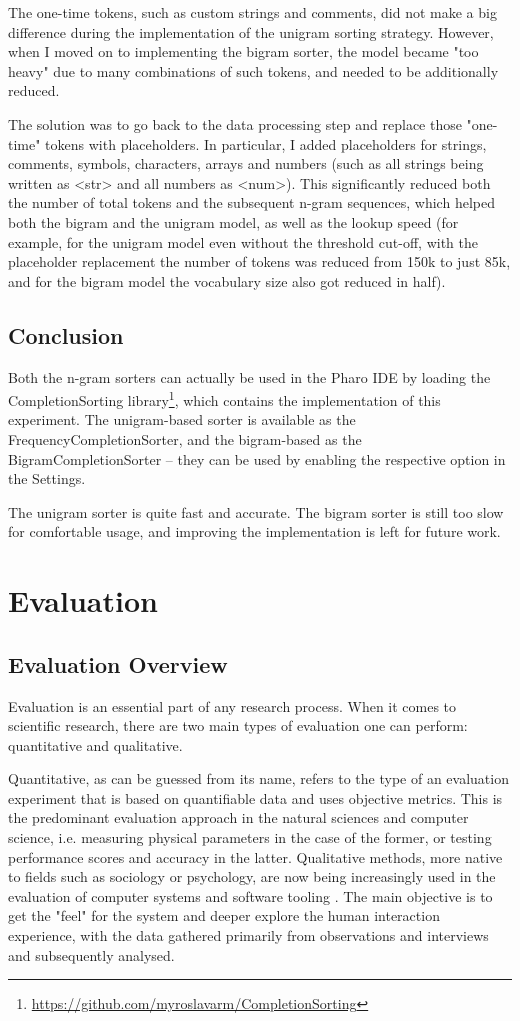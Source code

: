 \documentclass[sigplan,screen]{acmart}
\begin{document}
The one-time tokens, such as custom strings and comments, did not make a big difference during the implementation of the unigram sorting strategy. However, when I moved on to implementing the bigram sorter, the model became "too heavy" due to many combinations of such tokens, and needed to be additionally reduced.

The solution was to go back to the data processing step and replace those "one-time" tokens with placeholders. In particular, I added placeholders for strings, comments, symbols, characters, arrays and numbers (such as all strings being written as <str> and all numbers as <num>). This significantly reduced both the number of total tokens and the subsequent n-gram sequences, which helped both the bigram and the unigram model, as well as the lookup speed (for example, for the unigram model even without the threshold cut-off, with the placeholder replacement the number of tokens was reduced from 150k to just 85k, and for the bigram model the vocabulary size also got reduced in half).

\subsection{Conclusion}
Both the n-gram sorters can actually be used in the Pharo IDE by loading the CompletionSorting library\footnote{\url{https://github.com/myroslavarm/CompletionSorting}}, which contains the implementation of this experiment. The unigram-based sorter is available as the FrequencyCompletionSorter, and the bigram-based as the BigramCompletionSorter -- they can be used by enabling the respective option in the Settings.

The unigram sorter is quite fast and accurate. The bigram sorter is still too slow for comfortable usage, and improving the implementation is left for future work.

\section{Evaluation}
\subsection{Evaluation Overview}
Evaluation is an essential part of any research process. When it comes to scientific research, there are two main types of evaluation one can perform: quantitative and qualitative.

Quantitative, as can be guessed from its name, refers to the type of an evaluation experiment that is based on quantifiable data and uses objective metrics. This is the predominant evaluation approach in the natural sciences and computer science, i.e. measuring physical parameters in the case of the former, or testing performance scores and accuracy in the latter. Qualitative methods, more native to fields such as sociology or psychology, are now being increasingly used in the evaluation of computer systems and software tooling \cite{Hazz06a}. The main objective is to get the "feel" for the system and deeper explore the human interaction experience, with the data gathered primarily from observations and interviews and subsequently analysed.
\end{document}
